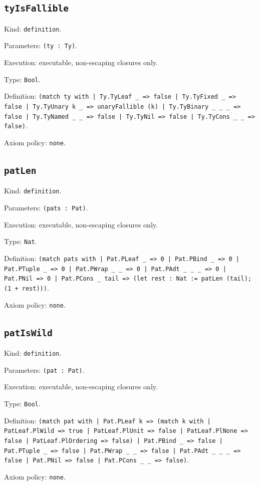 \documentclass[11pt]{article}
\begin{document}
\subsection*{\texttt{tyIsFallible}}
\noindent Kind: \texttt{definition}.\par
\noindent Parameters: \texttt{(ty : Ty)}.\par
\noindent Execution: executable, non-escaping closures only.\par
\noindent Type: \texttt{Bool}.\par
\noindent Definition: \texttt{(match ty with | Ty.TyLeaf \_ => false | Ty.TyFixed \_ => false | Ty.TyUnary k \_ => unaryFallible (k) | Ty.TyBinary \_ \_ \_ => false | Ty.TyNamed \_ \_ => false | Ty.TyNil => false | Ty.TyCons \_ \_ => false)}.\par
\noindent Axiom policy: \texttt{none}.\par
\subsection*{\texttt{patLen}}
\noindent Kind: \texttt{definition}.\par
\noindent Parameters: \texttt{(pats : Pat)}.\par
\noindent Execution: executable, non-escaping closures only.\par
\noindent Type: \texttt{Nat}.\par
\noindent Definition: \texttt{(match pats with | Pat.PLeaf \_ => 0 | Pat.PBind \_ => 0 | Pat.PTuple \_ => 0 | Pat.PWrap \_ \_ => 0 | Pat.PAdt \_ \_ \_ => 0 | Pat.PNil => 0 | Pat.PCons \_ tail => (let rest : Nat := patLen (tail); (1 + rest)))}.\par
\noindent Axiom policy: \texttt{none}.\par
\subsection*{\texttt{patIsWild}}
\noindent Kind: \texttt{definition}.\par
\noindent Parameters: \texttt{(pat : Pat)}.\par
\noindent Execution: executable, non-escaping closures only.\par
\noindent Type: \texttt{Bool}.\par
\noindent Definition: \texttt{(match pat with | Pat.PLeaf k => (match k with | PatLeaf.PlWild => true | PatLeaf.PlUnit => false | PatLeaf.PlNone => false | PatLeaf.PlOrdering => false) | Pat.PBind \_ => false | Pat.PTuple \_ => false | Pat.PWrap \_ \_ => false | Pat.PAdt \_ \_ \_ => false | Pat.PNil => false | Pat.PCons \_ \_ => false)}.\par
\noindent Axiom policy: \texttt{none}.\par
\end{document}

